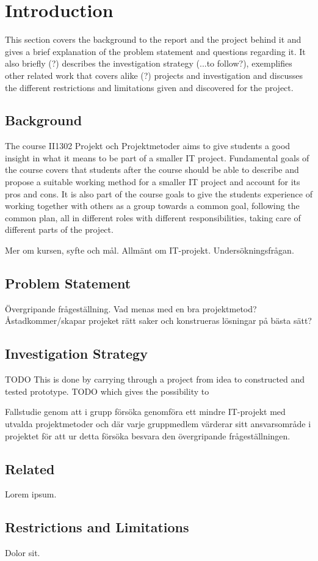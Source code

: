 \section{Introduction} 
This section covers the background to the report and the project behind it and gives a brief explanation of the problem statement and questions regarding it. It also briefly (?) describes the investigation strategy (...to follow?), exemplifies other related work that covers alike (?) projects and investigation and discusses the different restrictions and limitations given and discovered for the project. 


\subsection{Background}
The course II1302 Projekt och Projektmetoder aims to give students a good insight in what it means to be part of a smaller IT project. Fundamental goals of the course covers that students after the course should be able to describe and propose a suitable working method for a smaller IT project and account for its pros and cons. It is also part of the course goals to give the students experience of working together with others as a group towards a common goal, following the common plan, all in different roles with different responsibilities, taking care of different parts of the project. 

Mer om kursen, syfte och mål. Allmänt om IT-projekt. Undersökningsfrågan.

\subsection{Problem Statement}
Övergripande frågeställning.
Vad menas med en bra projektmetod? Åstadkommer/skapar projeket rätt saker och konstrueras
lösningar på bästa sätt?

\subsection{Investigation Strategy}
TODO
This is done by carrying through a project from idea to constructed and tested prototype. TODO which gives the possibility to

Fallstudie genom att i grupp försöka genomföra ett mindre IT-projekt med utvalda projektmetoder
och där varje gruppmedlem värderar sitt ansvarsområde i projektet för att ur detta försöka
besvara den övergripande frågeställningen.

\subsection{Related}
Lorem ipsum.

\subsection{Restrictions and Limitations}
Dolor sit.
